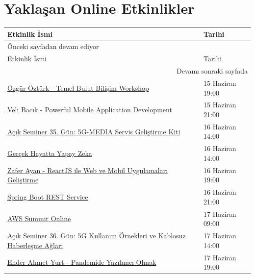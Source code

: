 \documentclass[11pt]{article}
\begin{document}
\section{Yaklaşan Online Etkinlikler}
\label{sec:org20e8626}
\begin{longtable}{|p{9.5cm}|l|}
\hline
Etkinlik İsmi & Tarihi\\
\hline
\endfirsthead
\multicolumn{2}{l}{Önceki sayfadan devam ediyor} \\
\hline

Etkinlik İsmi & Tarihi \\

\hline
\endhead
\hline\multicolumn{2}{r}{Devamı sonraki sayfada} \\
\endfoot
\endlastfoot
\hline
\href{https://kommunity.com/acmhacettepe/events/temel-bulut-bilisim-workshop-ozgur-ozturk-acsdays-1-334aedde}{Özgür Öztürk - Temel Bulut Bilişim Workshop} & 15 Haziran 19:00\\
\href{https://kommunity.com/acmhacettepe/events/powerful-mobile-application-development-veli-bacik-acsdays-2-2f8c2007}{Veli Bacık - Powerful Mobile Application Development} & 15 Haziran 21:00\\
\href{https://kommunity.com/tracikkaynak/events/acik-seminer-35-gun-5g-media-servis-gelistirme-kiti-0589a2f2}{Açık Seminer 35. Gün: 5G-MEDIA Servis Geliştirme Kiti} & 16 Haziran 14:00\\
\href{https://kommunity.com/cozumpark/events/gercek-hayatta-yapay-zeka-1bd98d10}{Gerçek Hayatta Yapay Zeka} & 16 Haziran 14:00\\
\href{https://kommunity.com/acmhacettepe/events/reactjs-ile-web-ve-mobil-uygulamalari-gelistirme-zafer-ayan-acsdays-3-336f845e}{Zafer Ayan - ReactJS ile Web ve Mobil Uygulamaları Geliştirme} & 16 Haziran 19:00\\
\href{https://kommunity.com/bilge-adam-teknoloji/events/spring-boot-rest-service-9f25998f}{Spring Boot REST Service} & 16 Haziran 21:00\\
\href{https://aws.amazon.com/events/summits/online/emea/agenda/}{AWS Summit Online} & 17 Haziran 09:00\\
\href{https://kommunity.com/tracikkaynak/events/acik-seminer-36-gun-5g-use-caseler-ve-5g-3gpp-standarlarindan-nef-8007f5c7}{Açık Seminer 36. Gün: 5G Kullanım Örnekleri ve Kablosuz Haberleşme Ağları} & 17 Haziran 14:00\\
\href{https://kommunity.com/acmhacettepe/events/pandemide-yazilimci-olmak-ender-ahmet-yurt-acsdays-5-af0545e2}{Ender Ahmet Yurt - Pandemide Yazılımcı Olmak} & 17 Haziran 19:00\\

\end{longtable}
\end{document}
